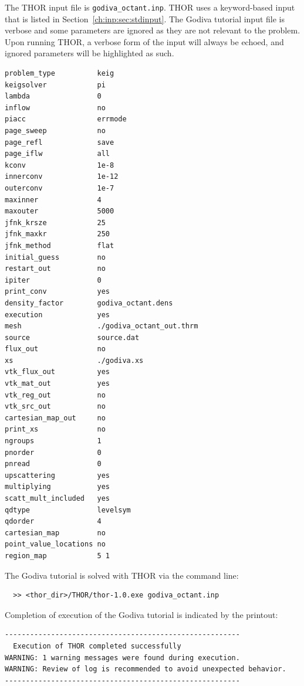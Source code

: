 The \ac{THOR} input file is \verb"godiva_octant.inp".
\ac{THOR} uses a keyword-based input that is listed in Section~\ref{ch:inp:sec:stdinput}.
The Godiva tutorial input file is verbose and some parameters are ignored as they are not relevant to the problem.
Upon running \ac{THOR}, a verbose form of the input will always be echoed, and ignored parameters will be highlighted as such.
\begin{verbatim}
problem_type          keig
keigsolver            pi
lambda                0
inflow                no
piacc                 errmode
page_sweep            no
page_refl             save
page_iflw             all
kconv                 1e-8
innerconv             1e-12
outerconv             1e-7
maxinner              4
maxouter              5000
jfnk_krsze            25
jfnk_maxkr            250
jfnk_method           flat
initial_guess         no
restart_out           no
ipiter                0
print_conv            yes
density_factor        godiva_octant.dens
execution             yes
mesh                  ./godiva_octant_out.thrm
source                source.dat
flux_out              no
xs                    ./godiva.xs
vtk_flux_out          yes
vtk_mat_out           yes
vtk_reg_out           no
vtk_src_out           no
cartesian_map_out     no
print_xs              no
ngroups               1
pnorder               0
pnread                0
upscattering          yes
multiplying           yes
scatt_mult_included   yes
qdtype                levelsym
qdorder               4
cartesian_map         no
point_value_locations no
region_map            5 1
\end{verbatim}

The Godiva tutorial is solved with \ac{THOR} via the command line:
\begin{verbatim}
  >> <thor_dir>/THOR/thor-1.0.exe godiva_octant.inp
\end{verbatim}

Completion of execution of the Godiva tutorial is indicated by the printout:
\begin{verbatim}
--------------------------------------------------------
  Execution of THOR completed successfully
WARNING: 1 warning messages were found during execution.
WARNING: Review of log is recommended to avoid unexpected behavior.
--------------------------------------------------------
\end{verbatim}

